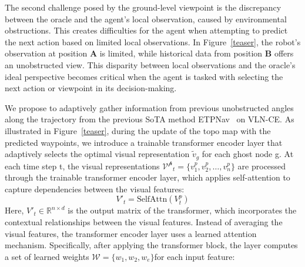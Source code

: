 The second challenge posed by the ground-level viewpoint is the discrepancy between the oracle and the agent's local observation, caused by environmental obstructions. This creates difficulties for the agent when attempting to predict the next action based on limited local observations. 
In Figure~\ref{teaser}, the robot’s observation at position \textbf{A} is limited, while historical data from position \textbf{B} offers an unobstructed view. This disparity between local observations and the oracle’s ideal perspective becomes critical when the agent is tasked with selecting the next action or viewpoint in its decision-making.

We propose to adaptively gather information from previous unobstructed angles along the trajectory from the previous SoTA method ETPNav~\cite{an2024etpnav} on VLN-CE. As illustrated in Figure~\ref{teaser}, during the update of the topo map with the predicted waypoints, we introduce a trainable transformer encoder layer that adaptively selects the optimal visual representation $\tilde{v}_g$ for each ghost node g. At each time step t, the visual representations $\mathcal{V^p}_t = \{v^p_1, v^p_2, \dots, v^p_n\}$ are processed through the trainable transformer encoder layer, which applies self-attention to capture dependencies between the visual features:
\[
V'_t = \text{SelfAttn}(V^p_t)
\]
Here, $V'_t \in \mathbb{R}^{n \times d}$ is the output matrix of the transformer, which incorporates the contextual relationships between the visual features. Instead of averaging the visual features, the transformer encoder layer uses a learned attention mechanism. Specifically, after applying the transformer block, the layer computes a set of learned weights $\mathcal{W} = \{w_1, w_2, w_e\}$for each input feature:

